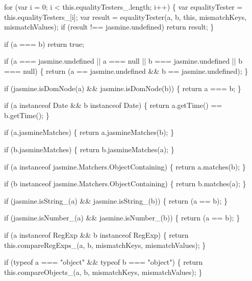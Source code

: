 \begin{DoxyCodeInclude}
  \textcolor{keywordflow}{for} (var i = 0; i < this.equalityTesters\_.length; i++) \{
    var equalityTester = this.equalityTesters\_[i];
    var result = equalityTester(a, b, \textcolor{keyword}{this}, mismatchKeys, mismatchValues);
    \textcolor{keywordflow}{if} (result !== jasmine.undefined) \textcolor{keywordflow}{return} result;
  \}

  \textcolor{keywordflow}{if} (a === b) \textcolor{keywordflow}{return} \textcolor{keyword}{true};

  \textcolor{keywordflow}{if} (a === jasmine.undefined || a === null || b === jasmine.undefined || b === null) \{
    \textcolor{keywordflow}{return} (a == jasmine.undefined && b == jasmine.undefined);
  \}

  \textcolor{keywordflow}{if} (jasmine.isDomNode(a) && jasmine.isDomNode(b)) \{
    \textcolor{keywordflow}{return} a === b;
  \}

  \textcolor{keywordflow}{if} (a instanceof Date && b instanceof Date) \{
    \textcolor{keywordflow}{return} a.getTime() == b.getTime();
  \}

  \textcolor{keywordflow}{if} (a.jasmineMatches) \{
    \textcolor{keywordflow}{return} a.jasmineMatches(b);
  \}

  \textcolor{keywordflow}{if} (b.jasmineMatches) \{
    \textcolor{keywordflow}{return} b.jasmineMatches(a);
  \}

  \textcolor{keywordflow}{if} (a instanceof jasmine.Matchers.ObjectContaining) \{
    \textcolor{keywordflow}{return} a.matches(b);
  \}

  \textcolor{keywordflow}{if} (b instanceof jasmine.Matchers.ObjectContaining) \{
    \textcolor{keywordflow}{return} b.matches(a);
  \}

  \textcolor{keywordflow}{if} (jasmine.isString\_(a) && jasmine.isString\_(b)) \{
    \textcolor{keywordflow}{return} (a == b);
  \}

  \textcolor{keywordflow}{if} (jasmine.isNumber\_(a) && jasmine.isNumber\_(b)) \{
    \textcolor{keywordflow}{return} (a == b);
  \}

  \textcolor{keywordflow}{if} (a instanceof RegExp && b instanceof RegExp) \{
    \textcolor{keywordflow}{return} this.compareRegExps\_(a, b, mismatchKeys, mismatchValues);
  \}

  \textcolor{keywordflow}{if} (typeof a === \textcolor{stringliteral}{"object"} && typeof b === \textcolor{stringliteral}{"object"}) \{
    \textcolor{keywordflow}{return} this.compareObjects\_(a, b, mismatchKeys, mismatchValues);
  \}


\end{DoxyCodeInclude}
